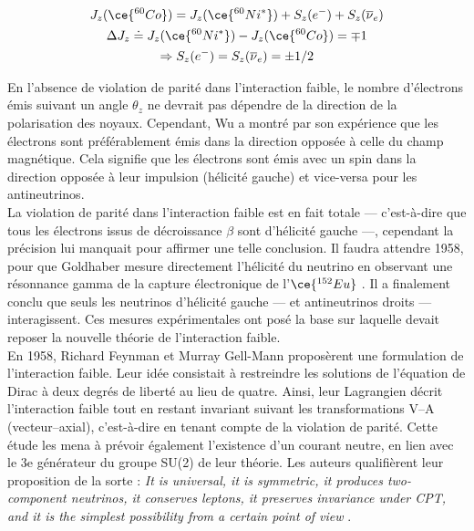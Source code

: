 \begin{gather}
    J_z(\ce{^{60}Co}) = J_z(\ce{^{60}Ni^*}) + S_z(e^-) + S_z(\overline{\nu}_e)\\
    \Delta J_z \doteq J_z(\ce{^{60}Ni^*}) - J_z(\ce{^{60}Co}) = \mp 1 \\
    \Rightarrow S_z(e^-) = S_z(\overline{\nu}_e) = \pm 1/2
\end{gather}

\bigbreak

En l'absence de violation de parité dans l'interaction faible, le nombre d'électrons émis suivant un angle $\theta_z$ ne devrait pas dépendre de la direction de la polarisation des noyaux. Cependant, Wu a montré par son expérience que les électrons sont préférablement émis dans la direction opposée à celle du champ magnétique. Cela signifie que les électrons sont émis avec un spin dans la direction opposée à leur impulsion (hélicité  gauche) et vice-versa pour les antineutrinos.\\

La violation de parité dans l'interaction faible est en fait totale --- c'est-à-dire que tous les électrons issus de décroissance $\beta$ sont d'hélicité gauche ---, cependant la précision lui manquait pour affirmer une telle conclusion. Il faudra attendre 1958, pour que Goldhaber mesure directement l'hélicité du neutrino en observant une résonnance gamma de la capture électronique de l'$\ce{^{152}Eu}$ \cite{Goldhaber:1958nb}. Il a finalement conclu que seuls les neutrinos d'hélicité gauche --- et antineutrinos droits --- interagissent. Ces mesures expérimentales ont posé la base sur laquelle devait reposer la nouvelle théorie de l'interaction faible.\\

En 1958, Richard Feynman et Murray Gell-Mann proposèrent une formulation de l'interaction faible. Leur idée consistait à restreindre les solutions de l'équation de Dirac à deux degrés de liberté au lieu de quatre. Ainsi, leur Lagrangien décrit l'interaction faible tout en restant invariant suivant les transformations V--A (vecteur--axial), c'est-à-dire en tenant compte de la violation de parité. Cette étude les mena à prévoir également l'existence d'un courant neutre, en lien avec le 3e générateur du groupe SU(2) de leur théorie. Les auteurs qualifièrent leur proposition de la sorte : \og \textit{It is universal, it is symmetric, it produces two-component neutrinos, it conserves leptons, it preserves invariance under CPT, and it is the simplest possibility from a certain point of view}\fg{} \cite{Feynman:1958ty}.

